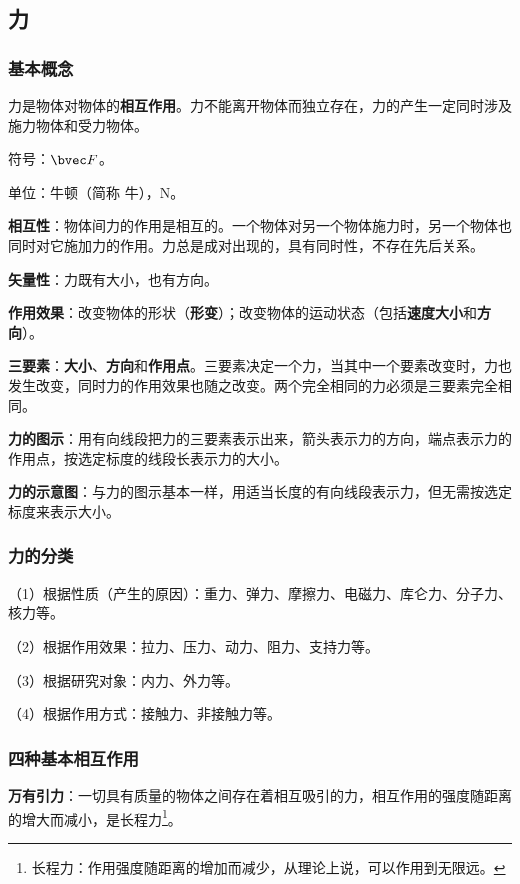 
\subsection{力}

\subsubsection{基本概念}
力是物体对物体的\textbf{相互作用}。力不能离开物体而独立存在，力的产生一定同时涉及施力物体和受力物体。

符号：$\bvec F$。

单位：牛顿（简称 牛），$\mathrm N$。

\textbf{相互性}：物体间力的作用是相互的。一个物体对另一个物体施力时，另一个物体也同时对它施加力的作用。力总是成对出现的，具有同时性，不存在先后关系。

\textbf{矢量性}：力既有大小，也有方向。

\textbf{作用效果}：改变物体的形状（\textbf{形变}）；改变物体的运动状态（包括\textbf{速度大小}和\textbf{方向}）。

\textbf{三要素}：\textbf{大小}、\textbf{方向}和\textbf{作用点}。三要素决定一个力，当其中一个要素改变时，力也发生改变，同时力的作用效果也随之改变。两个完全相同的力必须是三要素完全相同。

\textbf{力的图示}：用有向线段把力的三要素表示出来，箭头表示力的方向，端点表示力的作用点，按选定标度的线段长表示力的大小。

\textbf{力的示意图}：与力的图示基本一样，用适当长度的有向线段表示力，但无需按选定标度来表示大小。

\subsubsection{力的分类}
（1）根据性质（产生的原因）：重力、弹力、摩擦力、电磁力、库仑力、分子力、核力等。

（2）根据作用效果：拉力、压力、动力、阻力、支持力等。

（3）根据研究对象：内力、外力等。

（4）根据作用方式：接触力、非接触力等。

\subsubsection{四种基本相互作用}
\textbf{万有引力}：一切具有质量的物体之间存在着相互吸引的力，相互作用的强度随距离的增大而减小，是长程力\footnote{长程力：作用强度随距离的增加而减少，从理论上说，可以作用到无限远。}。

